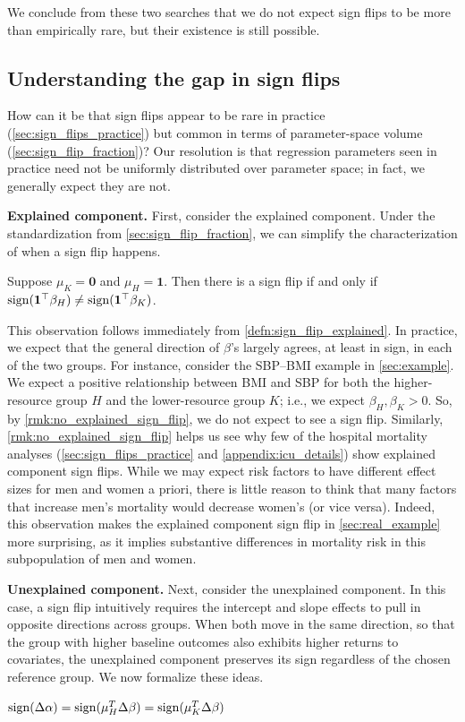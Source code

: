 We conclude from these two searches that we do not expect sign flips to be more than empirically rare, but
their existence is still possible.

\subsection{Understanding the gap in sign flips}
\label{sec:no_sign_flips}

How can it be that sign flips appear to be rare in practice (\cref{sec:sign_flips_practice}) but common in terms of parameter-space volume (\cref{sec:sign_flip_fraction})?
Our resolution is that regression parameters seen in practice need not be uniformly distributed over parameter space; in fact, we generally expect they are not.

\textbf{Explained component.} First, consider the explained component. Under the standardization from \cref{sec:sign_flip_fraction},
we can simplify the characterization of when a sign flip happens.
%
\begin{remark} \label{rmk:no_explained_sign_flip}
	Suppose $\mu_K = \mathbf{0}$ and $\mu_H = \mathbf{1}$.
	Then there is a sign flip if and only if $\operatorname{sign} (\mathbf{1}^\top \beta_{H}) \neq \operatorname{sign}( \mathbf{1}^\top \beta_{K})$.
\end{remark}
%
This observation follows immediately from \cref{defn:sign_flip_explained}.
In practice, we expect that the general direction of $\beta$'s largely agrees, at least in sign, in each of the two groups.
For instance, consider the SBP--BMI example in \cref{sec:example}. We expect a positive relationship between BMI and SBP for both the higher-resource group $H$ and the lower-resource group $K$;
i.e., we expect $\beta_H, \beta_K > 0$.
So, by \cref{rmk:no_explained_sign_flip}, we do not expect to see a sign flip.
Similarly, \cref{rmk:no_explained_sign_flip} helps us see why few of the hospital mortality analyses (\cref{sec:sign_flips_practice} and \cref{appendix:icu_details}) show explained component sign flips. 
While we may expect risk factors to have different effect sizes for men and women a priori, there is little reason to think that many factors that increase men's mortality would decrease women's (or vice versa).
Indeed, this observation makes the explained component sign flip in \cref{sec:real_example} more surprising, as it implies substantive differences in mortality risk in this subpopulation of men and women.

\textbf{Unexplained component.} Next, consider the unexplained component. In this case, a sign flip intuitively requires the intercept and slope effects to pull in opposite directions across groups. When both move in the same direction, so that the group with higher baseline outcomes also exhibits higher returns to covariates, the unexplained component preserves its sign regardless of the chosen reference group.
We now formalize these ideas.
\begin{assumption}
\label{ass:no_sign_flip}
$
    \operatorname{sign}(\Delta\alpha) = \operatorname{sign}(\mu_H^T \Delta\beta) = \operatorname{sign}(\mu_K^T \Delta\beta)
$
\end{assumption}

